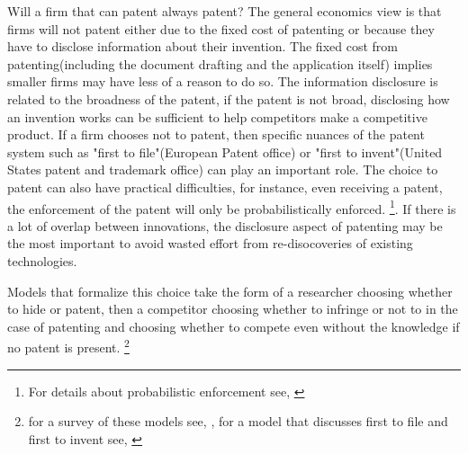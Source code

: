 \documentclass[12pt]{article}
\numberwithin{equation}{section}
\begin{document}
Will a firm that can patent always patent? The general economics view is that firms will not patent either due to the fixed cost of patenting or because they have to disclose information about their invention. The fixed cost from patenting(including the document drafting and the application itself) implies smaller firms may have less of a reason to do so. The information disclosure is related to the broadness of the patent, if the patent is not broad, disclosing how an invention works can be sufficient to help competitors make a competitive product. If a firm chooses not to patent, then specific nuances of the patent system such as "first to file"(European Patent office) or "first to invent"(United States patent and trademark office) can play an important role. The choice to patent can also have practical difficulties, for instance, even receiving a patent, the enforcement of the patent will only be probabilistically enforced. \footnote{For details about probabilistic enforcement see, \cite{Lemley2005}}. If there is a lot of overlap between innovations, the disclosure aspect of patenting may be the most important to avoid wasted effort from re-disocoveries of existing technologies\cite{Kultti2007}.

Models that formalize this choice take the form of a researcher choosing whether to hide or patent, then a competitor choosing whether to infringe or not to in the case of patenting and choosing whether to compete even without the knowledge if no patent is present. \footnote{for a survey of these models see, \cite{Hall2014}, for a model that discusses first to file and first to invent see, \cite{Scotchmer1990} }

\end{document}
